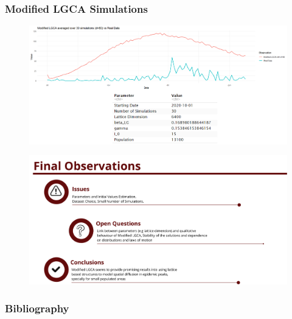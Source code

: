 \documentclass[usenames,dvipsnames]{beamer}
\newcommand{\dftitle}[2]{\color{#2}\bf{#1}\color{black}}
\begin{document}
\begin{frame}
	\frametitle{Modified LGCA Simulations}
	
	\begin{figure}
		\centering
		\includegraphics[width=0.95\linewidth]{Modmeans}
	\end{figure}
	
\end{frame}

 \begin{frame}

 	
 	\begin{figure}
 		\centering
 		\includegraphics[width=0.95\linewidth]{conlusions_pres}
 	\end{figure}
 	
 \end{frame}
	
	\begin{frame}
		\frametitle{Bibliography}	
		
		
		\nocite{*}
		
		

\end{frame}
\end{document}
